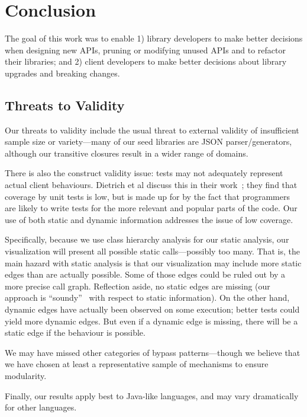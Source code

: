 \chapter{Conclusion}
\label{sec:conclusion}
The goal of this work was to enable 1) library developers to make better
decisions when designing new APIs, pruning or modifying unused APIs and to refactor their
libraries; and 2) client developers to make better decisions about library
upgrades and breaking changes.

\section{Threats to Validity}
Our threats to validity include the usual threat to external validity
of insufficient sample size or variety---many of our seed libraries
are JSON parser/generators, although our transitive closures result in
a wider range of domains.

There is also the construct validity issue: tests may
not adequately represent actual client behaviours. 
Dietrich et al discuss this in their work~\cite{dietrich2017construction}; 
they find that coverage by unit tests is low, 
but is made up for by the fact that programmers are likely to write tests for the more relevant and popular
parts of the code. Our use of both static
and dynamic information addresses the issue of low coverage. 

Specifically, because we use
class hierarchy analysis for our static analysis, our visualization will present
all possible static calls---possibly too many. 
That is, the main hazard with static analysis is that our visualization may include more
static edges than are actually possible. Some of those edges could be ruled out by a more
precise call graph. Reflection aside, no static edges
are missing (our approach is ``soundy''~\cite{livshits15:_in_defen_sound} with respect to static information). 
On the other hand, dynamic edges have actually been observed
on some execution; better tests could yield more dynamic edges. But even if
a dynamic edge is missing, there will be a static edge if the behaviour is possible.

We may have missed other categories of bypass patterns---though we believe
that we have chosen at least a representative sample of mechanisms to ensure
modularity. 

Finally, our results apply best to Java-like languages, and
may vary dramatically for other languages.

